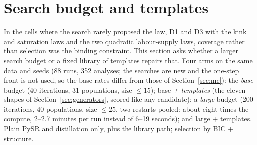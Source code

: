 \section{Search budget and templates}
\label{sec:budget}

In the cells where the search rarely proposed the law, D1 and D3 with the kink and saturation laws and the two quadratic labour-supply laws, coverage rather than selection was the binding constraint. This section asks whether a larger search budget or a fixed library of templates repairs that. Four arms on the same data and seeds (88 runs, 352 analyses; the searches are new and the one-step front is not used, so the base rates differ from those of Section~\ref{sec:mc}): the \emph{base} budget (40 iterations, 31 populations, size $\le 15$); base \emph{+ templates} (the eleven shapes of Section~\ref{sec:generators}, scored like any candidate); a \emph{large} budget (200 iterations, 40 populations, size $\le 25$, two restarts pooled: about eight times the compute, 2--2.7 minutes per run instead of 6--19 seconds); and large + templates. Plain PySR and distillation only, plus the library path; selection by BIC + structure.

\begin{table}[ht]
\centering\footnotesize
\setlength{\tabcolsep}{4pt}
\caption{Coverage $\to$ recovery by cell and arm (pooled candidates; coverage means some candidate has the true form).}
\label{tab:budget}
\end{table}

